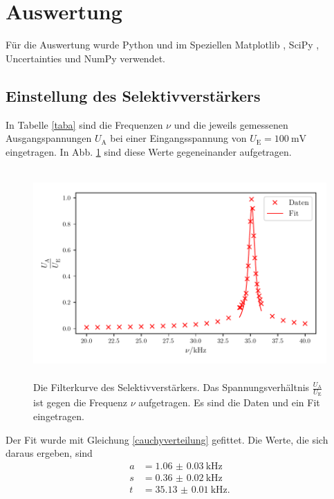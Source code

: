 \section{Auswertung}
\label{sec:Auswertung}

Für die Auswertung wurde Python und im Speziellen Matplotlib \cite{matplotlib}, SciPy \cite{scipy},
Uncertainties \cite{uncertainties} und NumPy \cite{numpy} verwendet.

\subsection{Einstellung des Selektivverstärkers}
In Tabelle \ref{taba} sind die Frequenzen $\nu$ und die jeweils gemessenen Ausgangspannungen $U_\text{A}$ 
bei einer Eingangsspannung von $U_\text{E} = \SI{100}{\milli\volt}$ eingetragen. 
In Abb. \ref{plota} sind diese Werte gegeneinander aufgetragen.



\begin{figure}
    \centering
    \includegraphics[width=15cm, height=8cm]{build/plota2.pdf} %
    \caption{Die Filterkurve des Selektivverstärkers. Das Spannungsverhältnis $\frac{U_\text{A}}{U_\text{E}}$
    ist gegen die Frequenz $\nu$ aufgetragen. Es sind die Daten und ein Fit eingetragen.}
    \label{plota}
\end{figure}

\noindent Der Fit wurde mit Gleichung \eqref{cauchyverteilung} gefittet. Die Werte, die sich daraus ergeben, sind
\begin{align*} 
  a &= \SI{1.06(3)}{\kilo\hertz} \\
  s &= \SI{0.36(2)}{\kilo\hertz} \\
  t &= \SI{35.13(1)}{\kilo\hertz}. 
\end{align*}


